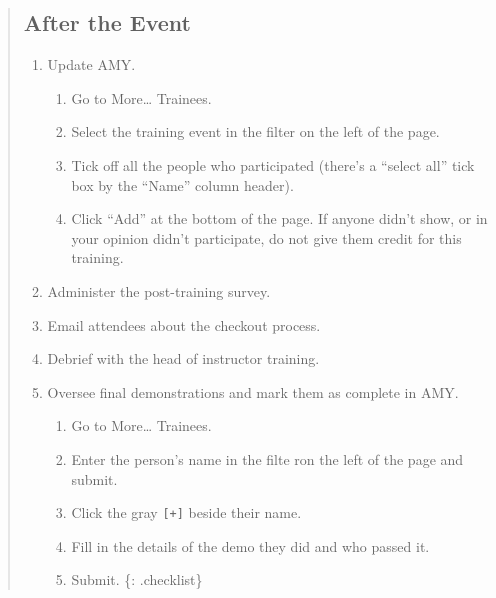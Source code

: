 \begin{quote}
\subsection{After the Event}\label{after-the-event}

\begin{enumerate}
\item
  Update AMY.

  \begin{enumerate}
    \item
    Go to More\ldots{} Trainees.
  \item
    Select the training event in the filter on the left of the page.
  \item
    Tick off all the people who participated (there's a ``select all''
    tick box by the ``Name'' column header).
  \item
    Click ``Add'' at the bottom of the page. If anyone didn't show, or
    in your opinion didn't participate, do not give them credit for this
    training.
  \end{enumerate}
\item
  Administer the post-training survey.
\item
  Email attendees about
  the checkout process.
\item
  Debrief with the head of instructor training.
\item
  Oversee final demonstrations and mark them as complete in AMY.

  \begin{enumerate}
    \item
    Go to More\ldots{} Trainees.
  \item
    Enter the person's name in the filte ron the left of the page and
    submit.
  \item
    Click the gray \texttt{{[}+{]}} beside their name.
  \item
    Fill in the details of the demo they did and who passed it.
  \item
    Submit. \{: .checklist\}
  \end{enumerate}
\end{enumerate}
\end{quote}

